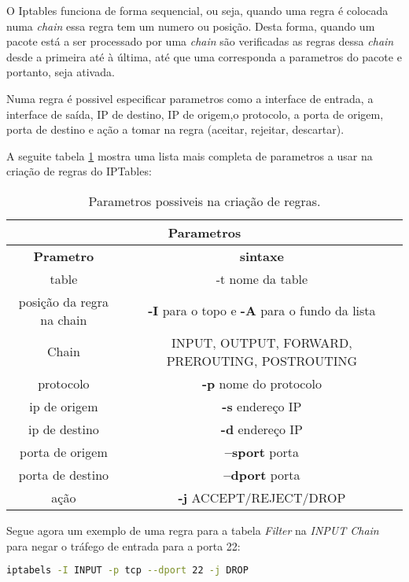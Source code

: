 
O Iptables funciona de forma sequencial, ou seja, quando uma regra é colocada
numa \textit{chain} essa regra tem um numero ou posição. Desta forma, quando um 
pacote está a ser processado por uma \textit{chain} são verificadas as regras 
dessa \textit{chain} desde a primeira até à última, até que uma corresponda a
parametros do pacote e portanto, seja ativada.

Numa regra é possivel especificar parametros como a interface de entrada, 
a interface de saída, IP de destino, IP de origem,o protocolo, a porta de 
origem, porta de destino e ação a tomar na regra (aceitar, rejeitar, descartar).

A seguite tabela \ref{ipt3args} mostra uma lista mais completa de parametros a usar na
criação de regras do IPTables:

\begin{table}[H]
\centering
\begin{tabular}{|c|c|}
\hline
\multicolumn{2}{|c|}{Parametros}\\
\hline
\textbf{Prametro} & \textbf{sintaxe} \\
\hline
table & -t nome da table \\
\hline
posição da regra na chain & \textbf{-I} para o topo e \textbf{-A} para o fundo da lista \\
\hline
Chain & INPUT, OUTPUT, FORWARD, PREROUTING, POSTROUTING \\
\hline
protocolo & \textbf{-p} nome do protocolo  \\
\hline
ip de origem & \textbf{-s} endereço IP  \\
\hline
ip de destino & \textbf{-d} endereço IP  \\
\hline
porta de origem & \textbf{--sport} porta  \\
\hline
porta de destino & \textbf{--dport} porta  \\
\hline
ação & \textbf{-j} ACCEPT/REJECT/DROP  \\
\hline
\end{tabular}
\caption{Parametros possiveis na criação de regras.}
\label{ipt3args}
\end{table}
    
Segue agora um exemplo de uma regra para a tabela \textit{Filter} na 
\textit{INPUT Chain} para negar o tráfego de entrada para a porta 22:

\begin{lstlisting}[language=Bash, caption={exemplo de comando}]
iptabels -I INPUT -p tcp --dport 22 -j DROP
\end{lstlisting}

